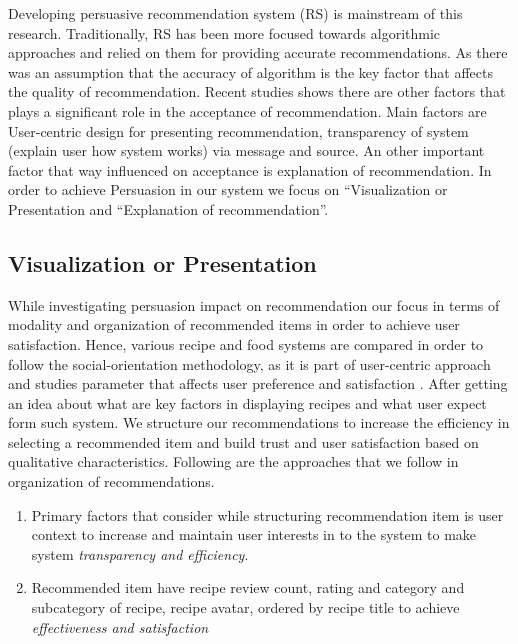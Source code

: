 Developing persuasive recommendation system (RS) is mainstream of this research. Traditionally, RS has been more focused towards algorithmic approaches and relied on them for providing accurate recommendations. As there was an assumption that the accuracy of algorithm is the key factor that affects the quality of recommendation. Recent studies shows there are other factors that plays a significant role in the acceptance of recommendation. Main factors are User-centric design for presenting recommendation, transparency of system (explain user how system works) via message and source. An other important factor that way influenced on acceptance is explanation of recommendation\cite{gkika2014persuasive}. In order to achieve Persuasion in our system we focus on   “Visualization or Presentation \cite{nanou2010effects} \cite{pu2006trust} and “Explanation of recommendation\cite{cialdini2009influence}\cite{fogg1998persuasive}”.
  
\subsection{Visualization or Presentation}

While investigating persuasion impact on recommendation our focus in terms of modality and organization of recommended items in order to achieve user satisfaction.  Hence, various recipe and food systems are compared in order to follow the social-orientation methodology, as it is part of user-centric approach and studies parameter that affects user preference and satisfaction \cite{ swearingen2002interaction}. After getting an idea about what are key factors in displaying recipes and what user expect form such system.  We structure our recommendations to increase the efficiency in selecting a recommended item and build trust and user satisfaction based on qualitative characteristics. Following are the approaches that we follow in organization of recommendations.

\begin{enumerate}
	\item Primary factors that consider while structuring recommendation item is user context to increase and maintain user interests in to the system to make system \textit{transparency and efficiency}. 
	
	\item Recommended item have recipe review count, rating and category and subcategory of recipe, recipe avatar, ordered by recipe title to achieve \textit{ effectiveness and satisfaction}
\end{enumerate}

